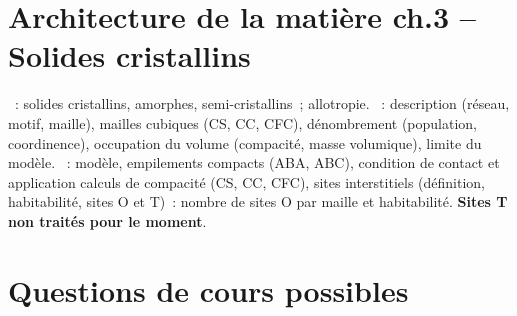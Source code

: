 \documentclass[a4paper, 11pt, final, garamond]{book}
\begin{document}
\section*{Architecture de la matière ch.3 -- Solides cristallins}
\begin{enumerate}[label=\Roman*]
  ~: solides cristallins, amorphes,
    semi-cristallins~; allotropie.
  ~: description (réseau, motif, maille),
    mailles cubiques (CS, CC, CFC), dénombrement (population, coordinence),
    occupation du volume (compacité, masse volumique), limite du modèle.
  ~: modèle, empilements compacts (ABA,
    ABC), condition de contact et application calculs de compacité (CS, CC,
    CFC), sites interstitiels (définition, habitabilité, sites O et T)~: nombre
    de sites O par maille et habitabilité. \textbf{Sites T non traités pour le
    moment}.
\end{enumerate}

\section{Questions de cours possibles}
\end{document}
